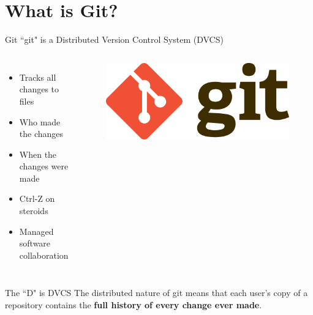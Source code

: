 \documentclass{beamer}
\begin{document}
    \section{What is Git?}\label{sec:what-is-git?}
    \begin{frame}{Git}
        ``git" is a Distributed Version Control System (DVCS)
        \begin{columns}
            \begin{itemize}
                \item Tracks all changes to files
                \item Who made the changes
                \item When the changes were made
                \item Ctrl-Z on steroids
                \item Managed software collaboration
            \end{itemize}

            \begin{figure}
                \centering
                \includegraphics[width=\textwidth]{figures/Git-Logo-2Color.png}
            \end{figure}

        \end{columns}
        \begin{alertblock}{The ``D" is DVCS}
            The distributed nature of git means that each user's copy of a repository contains the \textbf{full history of every change ever made}.
        \end{alertblock}
    \end{frame}
\end{document}
